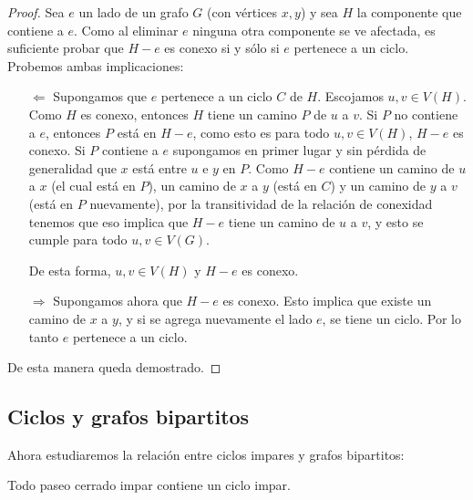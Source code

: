 \begin{proof}
    Sea $e$ un lado de un grafo $G$ (con vértices $x,y$) y sea $H$ la componente que contiene a $e$. Como al eliminar $e$ ninguna otra componente se ve afectada, es suficiente probar que $H - e$ es conexo si y sólo si $e$ pertenece a un ciclo. Probemos ambas implicaciones:
    
    \begin{enumerate}
        \item[$\Leftarrow$] Supongamos que $e$ pertenece a un ciclo $C$ de $H$. Escojamos $u, v \in V(H)$. Como $H$ es conexo, entonces $H$ tiene un camino $P$ de $u$ a $v$. Si $P$ no contiene a $e$, entonces $P$ está en $H - e$, como esto es para todo $u, v \in V(H)$, $H - e$ es conexo. Si $P$ contiene a $e$ supongamos en primer lugar y sin pérdida de generalidad que $x$ está entre $u$ e $y$ en $P$. Como $H - e$ contiene un camino de $u$ a $x$ (el cual está en $P$), un camino de $x$ a $y$ (está en $C$) y un camino de $y$ a $v$ (está en $P$ nuevamente), por la transitividad de la relación de conexidad tenemos que eso implica que $H - e$ tiene un camino de $u$ a $v$, y esto se cumple para todo $u, v \in V(G)$.
        
        De esta forma, $u, v \in V(H)$ y $H - e$ es conexo.
        
        \item[$\Rightarrow$] Supongamos ahora que $H - e$ es conexo. Esto implica que existe un camino de $x$ a $y$, y si se agrega nuevamente el lado $e$, se tiene un ciclo. Por lo tanto $e$ pertenece a un ciclo.
    \end{enumerate}
    
    De esta manera queda demostrado.
\end{proof}

\subsection{Ciclos y grafos bipartitos}

Ahora estudiaremos la relación entre ciclos impares y grafos bipartitos:

\begin{lem}
    Todo paseo cerrado impar contiene un ciclo impar.
\end{lem}

